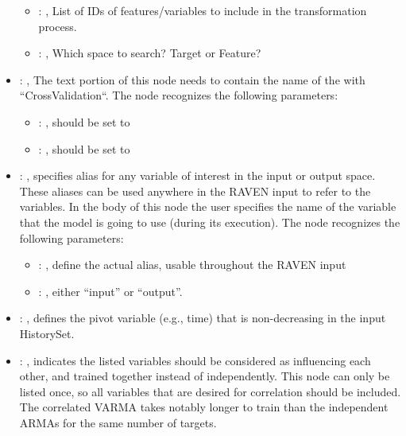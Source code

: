 \begin{itemize}
\begin{itemize}
        \item {}: , 
          List of IDs of features/variables to include in the transformation process.

        \item {}: , 
          Which space to search? Target or Feature?
      \end{itemize}

    \item {}: , 
      The text portion of this node needs to contain the name of the  with
               ``CrossValidation``.
      The  node recognizes the following parameters:
        \begin{itemize}
          \item {}: , 
            should be set to 
          \item {}: , 
            should be set to 
      \end{itemize}

    \item {}: , 
      specifies alias for         any variable of interest in the input or output space. These
      aliases can be used anywhere in the RAVEN input to         refer to the variables. In the body
      of this node the user specifies the name of the variable that the model is going to use
      (during its execution).
      The  node recognizes the following parameters:
        \begin{itemize}
          \item {}: , 
            define the actual alias, usable throughout the RAVEN input
          \item {}: , 
            either ``input'' or ``output''.
      \end{itemize}

    \item {}: , 
      defines the pivot variable (e.g., time) that is non-decreasing in
      the input HistorySet.

    \item {}: , 
      indicates the listed variables                                                    should be
      considered as influencing each other, and trained together instead of independently.  This
      node                                                    can only be listed once, so all
      variables that are desired for correlation should be included.  \nb The
      correlated VARMA takes notably longer to train than the independent ARMAs for the same number
      of targets.


\end{itemize}
